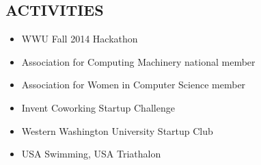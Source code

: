 \documentclass[line,margin]{res}
\begin{document}
\begin{resume}

\section{ACTIVITIES}
	\begin{itemize} \itemsep -3pt
	\item WWU Fall 2014 Hackathon
	\item Association for Computing Machinery national member
	\item Association for Women in Computer Science member
	\item Invent Coworking Startup Challenge
	\item Western Washington University Startup Club
	\item USA Swimming, USA Triathalon
	\end{itemize}


\end{resume}
\end{document}
